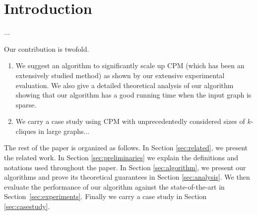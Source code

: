 \section{Introduction}
\label{sec:intro}

...

Our contribution is twofold.
\begin{enumerate}
 \item We suggest an algorithm to significantly scale up CPM (which has been an extensively studied method) as shown by our extensive experimental evaluation. We also give a detailed theoretical analysis of our algorithm showing that our algorithm has a good running time when the input graph is sparse.
 \item We carry a case study using CPM with unprecedentedly considered sizes of $k$-cliques in large graphs...
\end{enumerate}


The rest of the paper is organized as follows. In Section \ref{sec:related}, we present the related work. In Section \ref{sec:preliminaries} we explain the definitions and notations used throughout the paper. In Section \ref{sec:algorithm}, we present our algorithms and prove its theoretical guarantees in Section \ref{sec:analysis}. We then evaluate the performance of our algorithm against the state-of-the-art in Section~\ref{sec:experiments}. Finally we carry a case study in Section \ref{sec:casestudy}.
